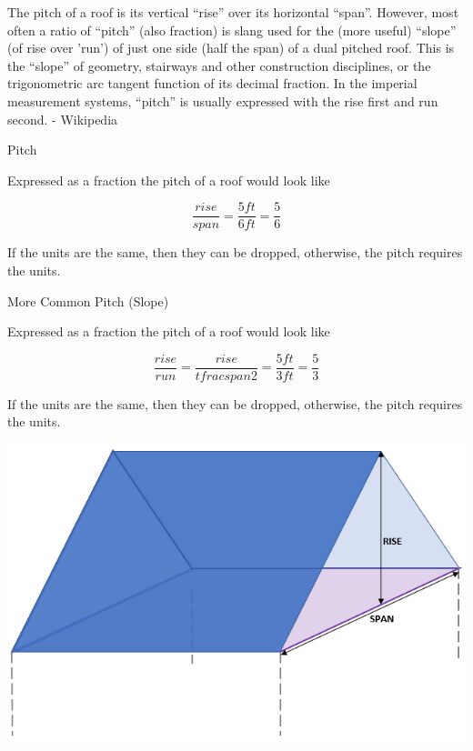 \documentclass{ximera}
\author{Alan Yang}
\begin{document}
The pitch of a roof is its vertical ``rise'' over its horizontal ``span''. However, most often a ratio of ``pitch'' (also fraction) is slang used for the (more useful) ``slope'' (of rise over 'run') of just one side (half the span) of a dual pitched roof. This is the ``slope'' of geometry, stairways and other construction disciplines, or the trigonometric arc tangent function of its decimal fraction. In the imperial measurement systems, ``pitch'' is usually expressed with the rise first and run second. - Wikipedia


\begin{example} Pitch


Expressed as a fraction the pitch of a roof would look like

\[
\frac{rise}{span} = \frac{5 ft}{6 ft} = \frac{5}{6}
\]

If the units are the same, then they can be dropped, otherwise, the pitch requires the units.
\end{example}






\begin{example} More Common Pitch (Slope)


Expressed as a fraction the pitch of a roof would look like

\[
\frac{rise}{run} = \frac{rise}{tfrac{span}{2}} = \frac{5 ft}{3 ft} = \frac{5}{3}
\]

If the units are the same, then they can be dropped, otherwise, the pitch requires the units.
\end{example}






\begin{image}
\includegraphics{pics/roofPitch.png}
\end{image}
\end{document}
